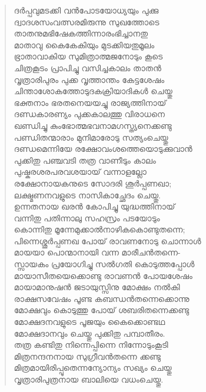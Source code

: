 \begin{verse}
ദര്‍പ്പവുമടക്കി വന്‍പോടയോധ്യയും പുക്കു\\
ദ്വാദശസംവത്സരമിരുന്നു സുഖത്തോടെ\\
താതനുമഭിഷേകത്തിന്നാരംഭിച്ചാനതു\\
മാതാവു കൈകേകിയും മുടക്കിയതുമൂലം\\
ഭ്രാതാവാകിയ സുമിത്രാത്മജനോടും കൂടെ\\
ചിത്രകൂടം പ്രാപിച്ചു വസിച്ചകാലം താതന്‍\\
വൃത്രാരിപുരം പുക്ക വൃത്താന്തം കേട്ടശേഷം\\
ചിന്താശോകത്തോടുദകക്രിയാദികള്‍ ചെയ്തു\\
ഭക്തനാം ഭരതനെയയച്ചു രാജ്യത്തിനായ്\\
ദണ്ഡകാരണ്യം പുക്കകാലത്തു വിരാധനെ\\
ഖണ്ഡിച്ചു കുംഭോത്മഭവനാമഗസ്ത്യനെക്കണ്ടു\\
പണ്ഡിതന്മാരാം മുനിമാരോടു സത്യംചെയ്തു\\
ദണ്ഡമെന്നിയേ രക്ഷോവംശത്തെയൊടുക്കുവാന്‍\\
പുക്കിതു പഞ്ചവടി തത്ര വാണീടും കാലം\\
പുഷ്കരശരപരവശയായ് വന്നാളല്ലോ\\
രക്ഷോനായകനുടെ സോദരി ശൂര്‍പ്പണഖാ;\\
ലക്ഷ്മണനവളുടെ നാസികാച്ഛേദം ചെയ്തു.\\
ഉന്നതനായ ഖരന്‍ കോപിച്ചു യുദ്ധത്തിനായ്\\
വന്നിതു പതിന്നാലു സഹസ്രം പടയോടും\\
കൊന്നിതു മൂന്നേമുക്കാല്‍നാഴികകൊണ്ടുതന്നെ;\\
പിന്നെശ്ശൂര്‍പ്പണഖ പോയ് രാവണനോടു ചൊന്നാള്‍\\
മായയാ പൊന്മാനായി വന്ന മാരീചന്‍തന്നെ-\\
സ്സായകം പ്രയോഗിച്ചു സല്‍ഗതി കൊടുത്തപ്പോള്‍\\
മായാസീതയെക്കൊണ്ടു രാവണന്‍ പോയശേഷം\\
മായാമാനുഷന്‍ ജടായുസ്സിനു മോക്ഷം നല്‍കി\\
രാക്ഷസവേഷം പൂണ്ട കബന്ധന്‍തന്നെക്കൊന്നു\\
മോക്ഷവും കൊടുത്തു പോയ് ശബരിതന്നെക്കണ്ടു\\
മോക്ഷദനവളുടെ പൂജയും കൈക്കൊണ്ടഥ\\
മോക്ഷദാനവും ചെയ്തു പുക്കിതു പമ്പാതീരം.\\
തത്ര കണ്ടിതു നിന്നെപ്പിന്നെ നിന്നോടുംകൂടി\\ 
മിത്രനന്ദനനായ സുഗ്രീവന്‍തന്നെ ക്കണ്ടു\\
മിത്രമായിരിപ്പൂതെന്നന്യോന്യം സഖ്യം ചെയ്തു\\
വൃത്രാരിപുത്രനായ ബാലിയെ വധംചെയ്തു.\\

\end{verse}
